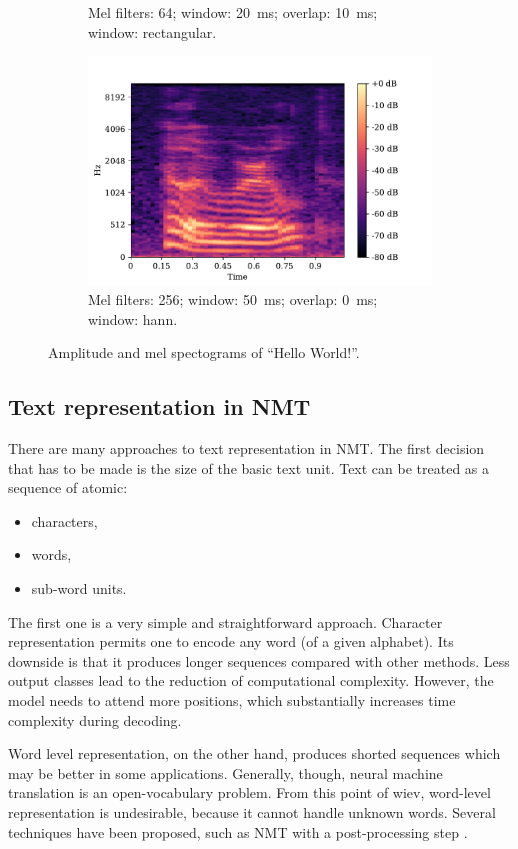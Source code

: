 \begin{figure}[]
\begin{subfigure}[b]{.49\textwidth}
		\caption{Mel filters: 64; window: 20~ms; overlap: 10~ms; window: rectangular.}
		\label{fig:sfig3}
	\end{subfigure}
     \hfill
	\begin{subfigure}[b]{.49\textwidth}
	\centering
	\includegraphics[width=.8\linewidth]{img/mel}
	\caption{Mel filters: 256; window: 50~ms; overlap: 0~ms; window: hann.}
	\label{fig:sfig4}
\end{subfigure}
	\caption{Amplitude and mel spectograms of ``Hello World!''.}
	\label{fig:mel}
\end{figure}

\pagebreak
\subsection{Text representation in NMT}
\label{intro:text_repre}

There are many approaches to text representation in NMT. The first decision that has to be made is the size of the basic text unit. Text can be treated as a sequence of atomic:

\begin{itemize}
	\item characters,
	\item words,
	\item sub-word units.
\end{itemize}

The first one is a very simple and straightforward approach. Character representation permits one to encode any word (of a given alphabet). Its downside is that it produces longer sequences compared with other methods. Less output classes lead to the reduction of computational complexity. However, the model needs to attend more positions, which substantially increases time complexity during decoding.

Word level representation, on the other hand, produces shorted sequences which may be better in some applications. Generally, though, neural machine translation is an open-vocabulary problem. From this point of wiev, word-level representation is undesirable, because it cannot handle unknown words. Several techniques have been proposed, such as NMT with a post-processing step .

